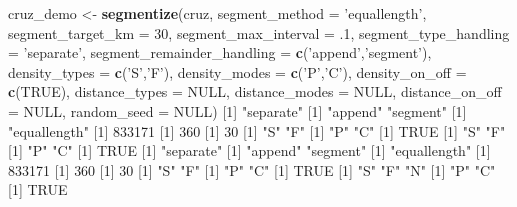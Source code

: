 \documentclass[
]{book}
\newenvironment{Shaded}{\begin{snugshade}}{\end{snugshade}}
\newcommand{\DataTypeTok}[1]{\textcolor[rgb]{0.13,0.29,0.53}{#1}}
\newcommand{\DecValTok}[1]{\textcolor[rgb]{0.00,0.00,0.81}{#1}}
\newcommand{\FloatTok}[1]{\textcolor[rgb]{0.00,0.00,0.81}{#1}}
\newcommand{\KeywordTok}[1]{\textcolor[rgb]{0.13,0.29,0.53}{\textbf{#1}}}
\newcommand{\NormalTok}[1]{#1}
\newcommand{\OtherTok}[1]{\textcolor[rgb]{0.56,0.35,0.01}{#1}}
\newcommand{\StringTok}[1]{\textcolor[rgb]{0.31,0.60,0.02}{#1}}
\begin{document}
\begin{Shaded}
\begin{Highlighting}[]
\NormalTok{cruz_demo <-}\StringTok{ }\KeywordTok{segmentize}\NormalTok{(cruz,}
                        \DataTypeTok{segment_method =} \StringTok{'equallength'}\NormalTok{,}
                        \DataTypeTok{segment_target_km =} \DecValTok{30}\NormalTok{,}
                        \DataTypeTok{segment_max_interval =} \FloatTok{.1}\NormalTok{,}
                        \DataTypeTok{segment_type_handling =} \StringTok{'separate'}\NormalTok{,}
                        \DataTypeTok{segment_remainder_handling =} \KeywordTok{c}\NormalTok{(}\StringTok{'append'}\NormalTok{,}\StringTok{'segment'}\NormalTok{),}
                        \DataTypeTok{density_types =} \KeywordTok{c}\NormalTok{(}\StringTok{'S'}\NormalTok{,}\StringTok{'F'}\NormalTok{),}
                        \DataTypeTok{density_modes =} \KeywordTok{c}\NormalTok{(}\StringTok{'P'}\NormalTok{,}\StringTok{'C'}\NormalTok{),}
                        \DataTypeTok{density_on_off =} \KeywordTok{c}\NormalTok{(}\OtherTok{TRUE}\NormalTok{),}
                        \DataTypeTok{distance_types =} \OtherTok{NULL}\NormalTok{,}
                        \DataTypeTok{distance_modes =} \OtherTok{NULL}\NormalTok{,}
                        \DataTypeTok{distance_on_off =} \OtherTok{NULL}\NormalTok{,}
                        \DataTypeTok{random_seed =} \OtherTok{NULL}\NormalTok{)}
\NormalTok{[}\DecValTok{1}\NormalTok{] }\StringTok{"separate"}
\NormalTok{[}\DecValTok{1}\NormalTok{] }\StringTok{"append"}  \StringTok{"segment"}
\NormalTok{[}\DecValTok{1}\NormalTok{] }\StringTok{"equallength"}
\NormalTok{[}\DecValTok{1}\NormalTok{] }\DecValTok{833171}
\NormalTok{[}\DecValTok{1}\NormalTok{] }\DecValTok{360}
\NormalTok{[}\DecValTok{1}\NormalTok{] }\DecValTok{30}
\NormalTok{[}\DecValTok{1}\NormalTok{] }\StringTok{"S"} \StringTok{"F"}
\NormalTok{[}\DecValTok{1}\NormalTok{] }\StringTok{"P"} \StringTok{"C"}
\NormalTok{[}\DecValTok{1}\NormalTok{] }\OtherTok{TRUE}
\NormalTok{[}\DecValTok{1}\NormalTok{] }\StringTok{"S"} \StringTok{"F"}
\NormalTok{[}\DecValTok{1}\NormalTok{] }\StringTok{"P"} \StringTok{"C"}
\NormalTok{[}\DecValTok{1}\NormalTok{] }\OtherTok{TRUE}
\NormalTok{[}\DecValTok{1}\NormalTok{] }\StringTok{"separate"}
\NormalTok{[}\DecValTok{1}\NormalTok{] }\StringTok{"append"}  \StringTok{"segment"}
\NormalTok{[}\DecValTok{1}\NormalTok{] }\StringTok{"equallength"}
\NormalTok{[}\DecValTok{1}\NormalTok{] }\DecValTok{833171}
\NormalTok{[}\DecValTok{1}\NormalTok{] }\DecValTok{360}
\NormalTok{[}\DecValTok{1}\NormalTok{] }\DecValTok{30}
\NormalTok{[}\DecValTok{1}\NormalTok{] }\StringTok{"S"} \StringTok{"F"}
\NormalTok{[}\DecValTok{1}\NormalTok{] }\StringTok{"P"} \StringTok{"C"}
\NormalTok{[}\DecValTok{1}\NormalTok{] }\OtherTok{TRUE}
\NormalTok{[}\DecValTok{1}\NormalTok{] }\StringTok{"S"} \StringTok{"F"} \StringTok{"N"}
\NormalTok{[}\DecValTok{1}\NormalTok{] }\StringTok{"P"} \StringTok{"C"}
\NormalTok{[}\DecValTok{1}\NormalTok{] }\OtherTok{TRUE}


\end{Highlighting}
\end{Shaded}
\end{document}
